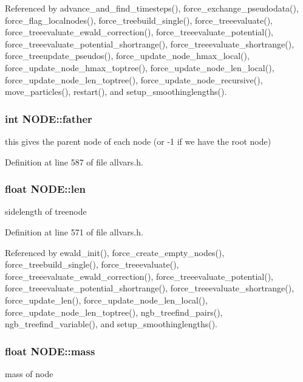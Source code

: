 Referenced by advance\_\-and\_\-find\_\-timesteps(), force\_\-exchange\_\-pseudodata(), force\_\-flag\_\-localnodes(), force\_\-treebuild\_\-single(), force\_\-treeevaluate(), force\_\-treeevaluate\_\-ewald\_\-correction(), force\_\-treeevaluate\_\-potential(), force\_\-treeevaluate\_\-potential\_\-shortrange(), force\_\-treeevaluate\_\-shortrange(), force\_\-treeupdate\_\-pseudos(), force\_\-update\_\-node\_\-hmax\_\-local(), force\_\-update\_\-node\_\-hmax\_\-toptree(), force\_\-update\_\-node\_\-len\_\-local(), force\_\-update\_\-node\_\-len\_\-toptree(), force\_\-update\_\-node\_\-recursive(), move\_\-particles(), restart(), and setup\_\-smoothinglengths().

\hypertarget{structNODE_a9a1b7edbe811165e40220f63a38f2d16}{
\subsubsection[{father}]{\setlength{\rightskip}{0pt plus 5cm}int {\bf NODE::father}}}
\label{structNODE_a9a1b7edbe811165e40220f63a38f2d16}
this gives the parent node of each node (or -\/1 if we have the root node) 

Definition at line 587 of file allvars.h.

\hypertarget{structNODE_aae35ad626e2613a4926d4e07fdf9be5c}{
\subsubsection[{len}]{\setlength{\rightskip}{0pt plus 5cm}float {\bf NODE::len}}}
\label{structNODE_aae35ad626e2613a4926d4e07fdf9be5c}
sidelength of treenode 

Definition at line 571 of file allvars.h.



Referenced by ewald\_\-init(), force\_\-create\_\-empty\_\-nodes(), force\_\-treebuild\_\-single(), force\_\-treeevaluate(), force\_\-treeevaluate\_\-ewald\_\-correction(), force\_\-treeevaluate\_\-potential(), force\_\-treeevaluate\_\-potential\_\-shortrange(), force\_\-treeevaluate\_\-shortrange(), force\_\-update\_\-len(), force\_\-update\_\-node\_\-len\_\-local(), force\_\-update\_\-node\_\-len\_\-toptree(), ngb\_\-treefind\_\-pairs(), ngb\_\-treefind\_\-variable(), and setup\_\-smoothinglengths().

\hypertarget{structNODE_adfb345bd40fc1835e54589b46622efda}{
\subsubsection[{mass}]{\setlength{\rightskip}{0pt plus 5cm}float {\bf NODE::mass}}}
\label{structNODE_adfb345bd40fc1835e54589b46622efda}
mass of node 

